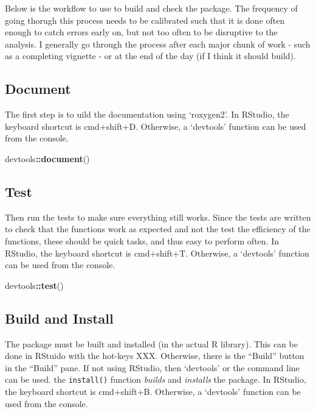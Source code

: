 \documentclass[]{book}
\newenvironment{Shaded}{\begin{snugshade}}{\end{snugshade}}
\newcommand{\KeywordTok}[1]{\textcolor[rgb]{0.13,0.29,0.53}{\textbf{#1}}}
\newcommand{\NormalTok}[1]{#1}
\newcommand{\OperatorTok}[1]{\textcolor[rgb]{0.81,0.36,0.00}{\textbf{#1}}}
\begin{document}
Below is the workflow to use to build and check the package. The frequency of going thorugh this process needs to be calibrated such that it is done often enough to catch errors early on, but not too often to be disruptive to the analysis. I generally go through the process after each major chunk of work - such as a completing vignette - or at the end of the day (if I think it should build).

\hypertarget{document}{%
\subsection{Document}\label{document}}

The first step is to uild the documentation using `roxygen2'. In RStudio, the keyboard shortcut is cmd+shift+D. Otherwise, a `devtools' function can be used from the console.

\begin{Shaded}
\begin{Highlighting}[]
\NormalTok{devtools}\OperatorTok{::}\KeywordTok{document}\NormalTok{()}
\end{Highlighting}
\end{Shaded}

\hypertarget{test}{%
\subsection{Test}\label{test}}

Then run the tests to make sure everything still works. Since the tests are written to check that the functions work as expected and not the test the efficiency of the functions, these should be quick tasks, and thus easy to perform often. In RStudio, the keyboard shortcut is cmd+shift+T. Otherwise, a `devtools' function can be used from the console.

\begin{Shaded}
\begin{Highlighting}[]
\NormalTok{devtools}\OperatorTok{::}\KeywordTok{test}\NormalTok{()}
\end{Highlighting}
\end{Shaded}

\hypertarget{build-and-install}{%
\subsection{Build and Install}\label{build-and-install}}

The package must be built and installed (in the actual R library). This can be done in RStuido with the hot-keys XXX. Otherwise, there is the ``Build'' button in the ``Build'' pane. If not using RStudio, then `devtools' or the command line can be used. the \texttt{install()} function \emph{builds} and \emph{installs} the package. In RStudio, the keyboard shortcut is cmd+shift+B. Otherwise, a `devtools' function can be used from the console.
\end{document}
